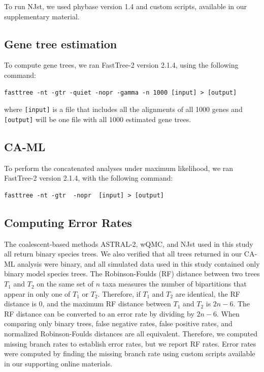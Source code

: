 To run NJst, we used phybase version 1.4
and custom scripts, available in our supplementary material. 


\subsection{Gene tree estimation}
To compute gene trees, we ran FastTree-2  version 2.1.4, using the following command:
\begin{verbatim}
fasttree -nt -gtr -quiet -nopr -gamma -n 1000 [input] > [output]
\end{verbatim}
where {\tt [input]} is a file that includes all the alignments of all 1000 genes and 
{\tt [output]} will be one file with all 1000 estimated gene trees. 

\subsection{CA-ML}
To perform the concatenated  analyses under maximum likelihood,
we ran FastTree-2 version 2.1.4, with the following
command:
\begin{verbatim}
fasttree -nt -gtr  -nopr  [input] > [output]
\end{verbatim}


\subsection{Computing Error Rates}
The coalescent-based methods ASTRAL-2, wQMC, and NJst used in this study all return binary species trees.   We also verified that all trees returned in our CA-ML analysis were binary, and all simulated data used in this study contained only binary model species trees.  The Robinson-Foulds (RF)  distance \cite{RF} between two trees $T_{1}$ and $T_{2}$ on the same set of  $n$ taxa measures the number of bipartitions that appear in only one of $T_{1}$  or $T_{2}$.  Therefore, if $T_{1}$ and $T_{2}$ are identical, the RF distance is 0, and the maximum RF distance between $T_{1}$ and $T_{2}$ is $2n-6$.  The RF distance can be converted to an error rate by dividing by $2n-6$.   When comparing only binary trees, false negative rates, false positive rates, and normalized Robinson-Foulds distances  are all equivalent.  Therefore, we computed missing branch rates to establish error rates, but we report RF rates. Error rates were computed by finding the missing branch rate using custom scripts available in our supporting online materials.  



